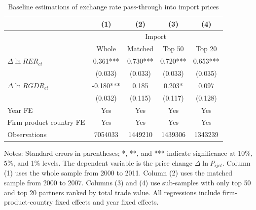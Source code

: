 \documentclass[12pt]{article}
\begin{document}
\begin{table}[htbp]
	\centering
	\caption{Baseline estimations of exchange rate pass-through into import prices}
	\begin{threeparttable}
		\begin{tabular}{lcccc}
			\toprule
			& (1)   & (2)   & (3)   & (4) \\
			\midrule
			& \multicolumn{4}{c}{Import} \\
			& Whole & Matched & Top 50 & Top 20 \\
			\midrule
			$\Delta \ln RER_{ct}$ & 0.361*** & 0.730*** & 0.720*** & 0.653*** \\
			& (0.033) & (0.033) & (0.033) & (0.035) \\
			$\Delta \ln RGDR_{ct}$ & -0.180*** & 0.185 & 0.203* & 0.097 \\
			& (0.032) & (0.115) & (0.117) & (0.128) \\
			Year FE  & Yes   & Yes   & Yes   & Yes \\
			Firm-product-country FE & Yes   & Yes   & Yes   & Yes \\
			Observations & 7054033 & 1449210 & 1439306 & 1343239 \\
			\bottomrule
		\end{tabular}
		\begin{tablenotes}
			\footnotesize
			\item[Notes:] Standard errors in parentheses; *, **, and *** indicate significance at 10\%, 5\%, and 1\% levels. The dependent variable is the price change $\Delta \ln P_{ijct}$. Column (1) uses the whole sample from 2000 to 2011. Column (2) uses the matched sample from 2000 to 2007. Columns (3) and (4) use sub-samples with only top 50 and top 20 partners ranked by total trade value. All regressions include firm-product-country fixed effects and year fixed effects. 
		\end{tablenotes}
	\end{threeparttable}
	\label{tab.baseline}
\end{table}
\end{document}
